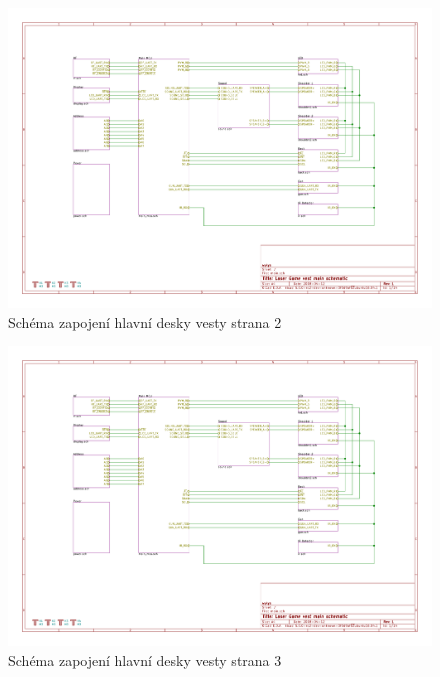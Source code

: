 \begin{landscape}
    \begin{figure}[h]
        \centering
        \includegraphics[page=2, height=\textwidth]{sch/main}
        \caption{Schéma zapojení hlavní desky vesty strana 2}
    \end{figure}
\end{landscape}
\begin{landscape}
    \begin{figure}[h]
        \centering
        \includegraphics[page=3, height=\textwidth]{sch/main}
        \caption{Schéma zapojení hlavní desky vesty strana 3}
    \end{figure}
\end{landscape}
